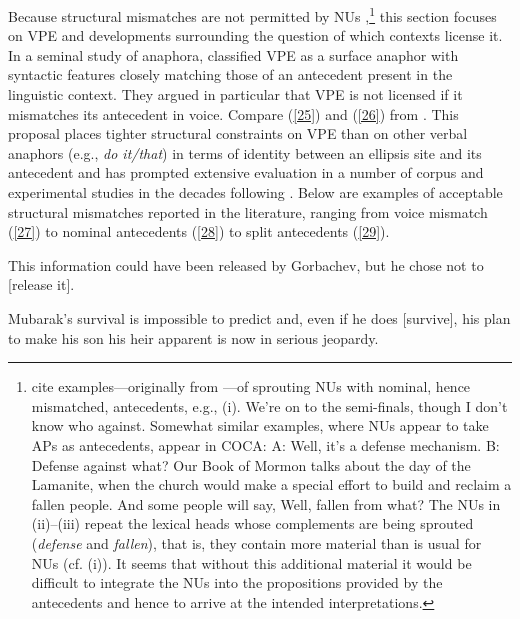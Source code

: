 \documentclass[output=paper
                ,modfonts
                ,nonflat
	        ,collection
	        ,collectionchapter
	        ,collectiontoclongg
 	        ,biblatex
                ,babelshorthands
                ,newtxmath
                ,draftmode
                ,colorlinks, citecolor=brown
]{./langsci/langscibook}
\begin{document}
{Because structural mismatches are not permitted by NUs \citep[see][]{Merchant2005a, Merchant2013},\footnote{\citet{Ginzburg2018} cite examples---originally from \citet{Beecher2008}---of sprouting NUs with nominal, hence mismatched, antecedents, e.g., (i).
	\ea We're on to the semi-finals, though I don't know who against.\z
	Somewhat similar examples, where NUs appear to take APs as antecedents, appear in COCA:
	\ea  A: Well, it's a defense mechanism. B: Defense against what?\z
	\ea Our Book of Mormon talks about the day of the Lamanite, when the church would make a special effort to build and reclaim a fallen people. And some people will say, Well, fallen from what? \z
	The NUs in (ii)--(iii) repeat the lexical heads whose complements are being sprouted (\emph{defense} and \emph{fallen}), that is, they contain more material than is usual for NUs (cf. (i)). It seems that without this additional material it would be difficult to integrate the NUs into the propositions provided by the antecedents and hence to arrive at the intended interpretations.
} this section focuses on VPE and developments surrounding the question of which contexts license it. In a seminal study of anaphora, \citet{Hankamer1976} classified VPE as a surface anaphor with syntactic features closely matching those of an antecedent present in the linguistic context. They argued in particular that VPE is not licensed if it mismatches its antecedent in voice. Compare (\ref{25}) and (\ref{26}) from \citet[327]{Hankamer1976}.
\z
{}
\z
This proposal places tighter structural constraints on VPE than on other verbal anaphors (e.g., \emph{do it/that}) in terms of identity between an ellipsis site and its antecedent and has prompted extensive evaluation in a number of corpus and experimental studies in the decades following \citet{Hankamer1976}. Below are examples of acceptable structural mismatches reported in the literature, ranging from voice mismatch (\ref{27}) to nominal antecedents (\ref{28}) to split antecedents (\ref{29}).

\ea This information could have been released by Gorbachev, but he chose not to [release it]. \citep[37]{Hardt1993} \label{27}\z

\ea Mubarak's survival is impossible to predict and, even if he does [survive], his plan to make his son his heir apparent is now in serious jeopardy. \citep{Miller2014a} \label{28}\z

}
\end{document}
